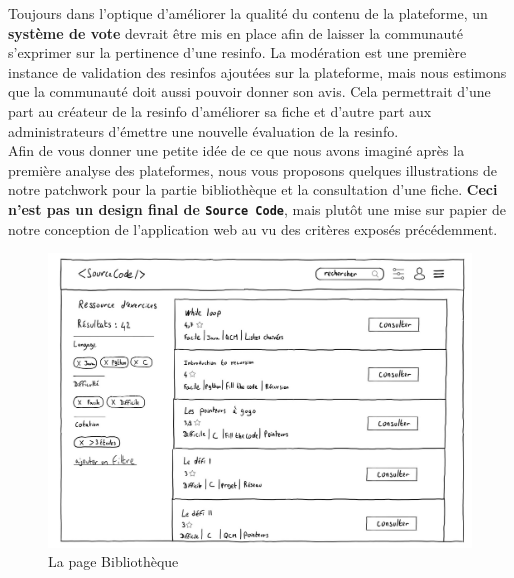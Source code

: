 Toujours dans l'optique d'améliorer la qualité du contenu de la plateforme, un \textbf{système de vote} devrait être mis en place afin de laisser la communauté s'exprimer sur la pertinence d'une \gls{resinfo}. La modération est une première instance de validation des \glspl{resinfo} ajoutées sur la plateforme, mais nous estimons que la communauté doit aussi pouvoir donner son avis. Cela permettrait d'une part au créateur de la \gls{resinfo} d'améliorer sa \gls{fiche} et d'autre part aux administrateurs d'émettre une nouvelle évaluation de la \gls{resinfo}.\\

Afin de vous donner une petite idée de ce que nous avons imaginé après la première analyse des plateformes, nous vous proposons quelques illustrations de notre patchwork pour la partie bibliothèque et la consultation d'une \gls{fiche}. \textbf{Ceci n'est pas un design final de \texttt{Source Code}}, mais plutôt une mise sur papier de notre conception de l'application web au vu des critères exposés précédemment.\\

\begin{figure}[H]
    \includegraphics[width=\textwidth,height=\textheight,keepaspectratio]{images/library.JPG}
    \centering
    \caption{La page Bibliothèque}
\end{figure}
\label{figure:patchwork}

